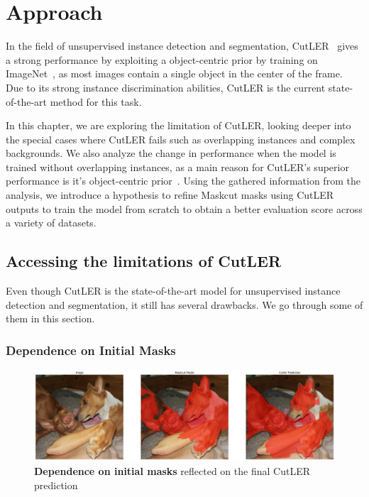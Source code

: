 \chapter{Approach}\label{chap:approach}

In the field of unsupervised instance detection and segmentation, CutLER~\cite{wang2023cut} gives a strong performance by exploiting a  object-centric prior by training on ImageNet~\cite{deng2009imagenet}, as most images contain a single
object in the center of the frame.  Due to its strong instance discrimination abilities, CutLER is the current state-of-the-art method for this task.

In this chapter, we are exploring the limitation of CutLER, looking deeper into the special cases where CutLER fails such as overlapping instances and complex backgrounds. We also analyze the change in performance when the model is trained without overlapping instances, as a main reason for CutLER's superior  performance is it's object-centric prior~\cite{engstler2023understanding}. Using the gathered information from the analysis, we introduce a hypothesis to refine Maskcut masks using CutLER outputs to train the model from scratch to obtain a better evaluation score across a variety of datasets.

\section{Accessing the limitations of CutLER}
Even though CutLER is the state-of-the-art model for unsupervised instance detection and segmentation, it still has several drawbacks. We go through some of them in this section.

\subsection{Dependence on Initial Masks}
\begin{figure}
	\centering
	\includegraphics[width=1\textwidth]{Images/main/cutler_problem_3.png}
	\caption[\textbf{Dependence on Initial Masks}]{\textbf{Dependence on initial masks} reflected on the final CutLER prediction}
	\label{fig:intial_mask_dependence}
\end{figure}

